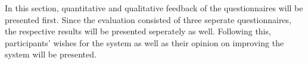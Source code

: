 In this section, quantitative and qualitative feedback of the questionnaires 
will be presented first.
Since the evaluation consisted of three seperate questionnaires, 
the respective results will be presented seperately as well.
Following this, participants' wishes for the system as well as their opinion 
on improving the system will be presented.


